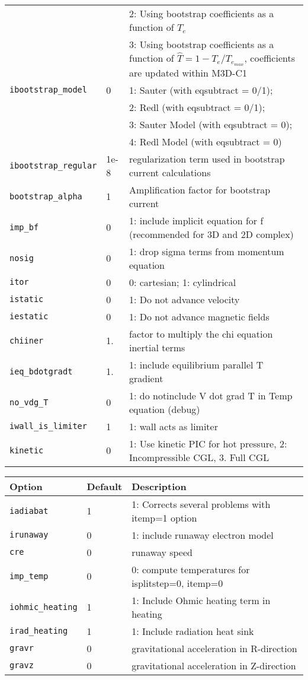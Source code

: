 \begin{tabular}{llp{4in}}
                      &   & 2: Using bootstrap coefficients as a function of $T_e$ \\
                      &   & 3: Using bootstrap coefficients as a function of $\hat{T}=1-T_e/T_e_{max}$, coefficients are updated within M3D-C1 \\
  \texttt{ibootstrap\_model} & 0 & 1: Sauter (with eqsubtract = 0/1); \\
                             &   & 2: Redl (with eqsubtract = 0/1); \\
                             &   & 3: Sauter Model (with eqsubtract = 0); \\
                             &   & 4: Redl Model (with eqsubtract = 0) \\
  \texttt{ibootstrap\_regular} & 1e-8 & regularization term used in bootstrap current calculations \\
  \texttt{bootstrap\_alpha} & 1 & Amplification factor for bootstrap current \\
  \texttt{imp\_bf} & 0 & 1: include implicit equation for f (recommended for
  3D and 2D complex) \\
  \texttt{nosig} & 0 & 1: drop sigma terms from momentum equation \\
  \texttt{itor}   & 0   & 0: cartesian; 1: cylindrical\\
  \texttt{istatic}& 0   & 1: Do not advance velocity\\
  \texttt{iestatic}&0   & 1: Do not advance magnetic fields\\
  \texttt{chiiner} & 1. & factor to multiply the chi equation inertial terms \\
  \texttt{ieq\_bdotgradt} & 1. & 1: include equilibrium parallel T gradient \\
  \texttt{no\_vdg\_T} & 0 & 1: do notinclude V dot grad T in Temp equation (debug) \\
  \texttt{iwall\_is\_limiter} & 1 & 1: wall acts as limiter \\
  \texttt{kinetic} & 0 & 1: Use kinetic PIC for hot pressure, 
                         2: Incompressible CGL,
                         3. Full CGL  
\end{tabular}

\begin{tabular}{llp{4in}}
  \textbf{Option}&\textbf{Default}&\textbf{Description}\\
  \hline
  \texttt{iadiabat} & 1 & 1: Corrects several problems with itemp=1 option \\
  \texttt{irunaway} & 0 & 1:  include runaway electron model \\
  \texttt{cre} & 0 & runaway speed \\
  \texttt{imp\_temp} & 0 & 0: compute temperatures for isplitstep=0, itemp=0 \\
  \texttt{iohmic\_heating} & 1 & 1: Include Ohmic heating term in heating \\
  \texttt{irad\_heating} & 1 & 1: Include radiation heat sink \\
  \texttt{gravr} & 0 & gravitational acceleration in R-direction \\
  \texttt{gravz} & 0 & gravitational acceleration in Z-direction 
\end{tabular}

